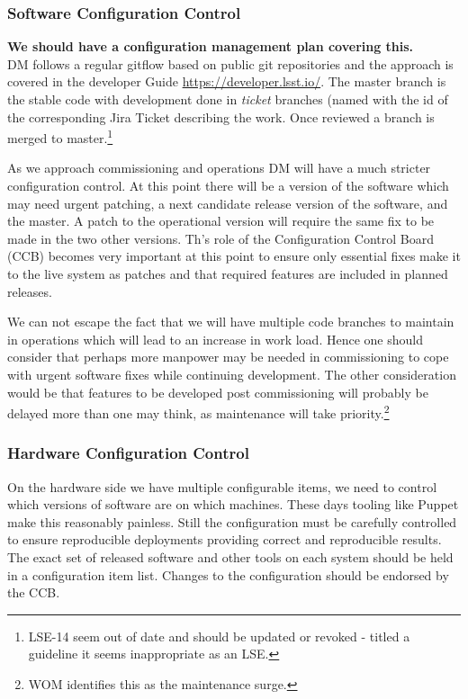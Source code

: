 \subsubsection{Software Configuration Control}
{\bf We should have a configuration management plan covering this.} \\

DM follows a regular gitflow based on public git repositories and the approach is covered in the developer Guide \url{https://developer.lsst.io/}.
The master branch is the stable code with development done in {\em ticket} branches (named with the id of the corresponding Jira Ticket describing the work. Once reviewed a branch is merged to master.\footnote{LSE-14 seem out of date and should be updated or revoked - titled a guideline it seems inappropriate as an LSE.}

As we approach commissioning and operations DM will have a much stricter configuration control. At this point there will be a version of the software which may need urgent patching, a
next candidate release version of the software, and the master. A patch to the operational version
will require the same fix to be made in the two other versions. Th's role of the Configuration Control Board (CCB) becomes very important at this point to ensure only essential fixes make it to the live system as patches and that required features are included in planned releases.


We  can not escape the fact that we  will have multiple code branches to maintain in operations which will lead to an increase in work load.
Hence one should consider that perhaps more manpower may be needed in commissioning to cope with urgent
software fixes while continuing development. The other consideration would be that features to
be developed post commissioning will probably be delayed more than one may think, as maintenance will take priority.\footnote{WOM identifies this as the maintenance surge.}

\subsubsection{Hardware Configuration Control}
On the hardware side we have multiple configurable items, we need to control which versions of software are on which machines. These days tooling like Puppet make this reasonably painless. Still the configuration  must be carefully controlled to ensure reproducible deployments providing correct and reproducible results. The exact set of released software and other tools on each system should be held in a configuration item list. 
Changes to the configuration should be endorsed by the CCB. 


